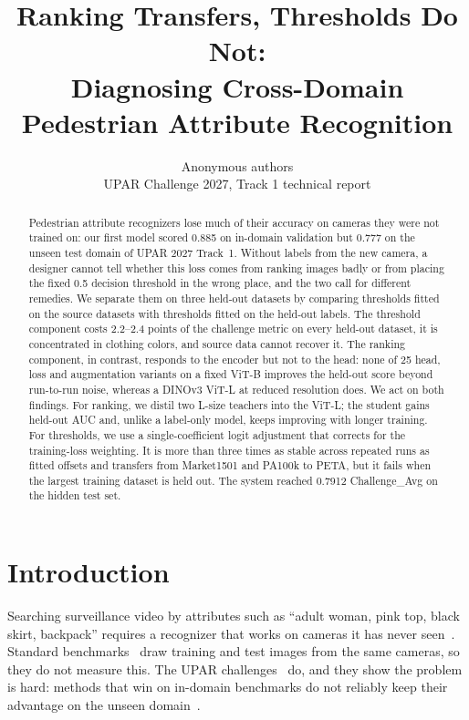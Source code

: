 \documentclass[10pt,twocolumn,letterpaper]{article}
\title{\Large\bf Ranking Transfers, Thresholds Do Not:\\ Diagnosing Cross-Domain Pedestrian Attribute Recognition}
\author{Anonymous authors\\ UPAR Challenge 2027, Track 1 technical report}
\date{}
\begin{document}
\maketitle

\begin{abstract}
Pedestrian attribute recognizers lose much of their accuracy on cameras they were not trained on: our first model scored 0.885 on in-domain validation but 0.777 on the unseen test domain of UPAR 2027 Track~1. Without labels from the new camera, a designer cannot tell whether this loss comes from ranking images badly or from placing the fixed 0.5 decision threshold in the wrong place, and the two call for different remedies. We separate them on three held-out datasets by comparing thresholds fitted on the source datasets with thresholds fitted on the held-out labels. The threshold component costs 2.2--2.4 points of the challenge metric on every held-out dataset, it is concentrated in clothing colors, and source data cannot recover it. The ranking component, in contrast, responds to the encoder but not to the head: none of 25 head, loss and augmentation variants on a fixed ViT-B improves the held-out score beyond run-to-run noise, whereas a DINOv3 ViT-L at reduced resolution does. We act on both findings. For ranking, we distil two L-size teachers into the ViT-L; the student gains held-out AUC and, unlike a label-only model, keeps improving with longer training. For thresholds, we use a single-coefficient logit adjustment that corrects for the training-loss weighting. It is more than three times as stable across repeated runs as fitted offsets and transfers from Market1501 and PA100k to PETA, but it fails when the largest training dataset is held out. The system reached 0.7912 Challenge\_Avg on the hidden test set.
\end{abstract}

\section{Introduction}

Searching surveillance video by attributes such as ``adult woman, pink top, black skirt, backpack'' requires a recognizer that works on cameras it has never seen~\cite{upar}. Standard benchmarks~\cite{peta,pa100k,market} draw training and test images from the same cameras, so they do not measure this. The UPAR challenges~\cite{upar23,upar24} do, and they show the problem is hard: methods that win on in-domain benchmarks do not reliably keep their advantage on the unseen domain~\cite{upar23,upar24}.
\end{document}
